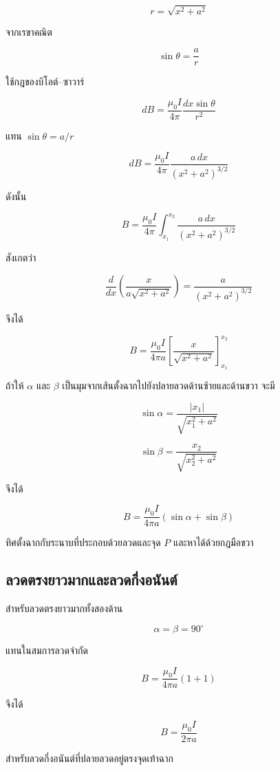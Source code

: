 \[
r=\sqrt{x^2+a^2}
\]

จากเรขาคณิต

\[
\sin\theta=\frac{a}{r}
\]

ใช้กฎของบิโอต์--ซาวาร์

\[
dB
=
\frac{\mu_0 I}{4\pi}
\frac{dx\sin\theta}{r^2}
\]

แทน $\sin\theta=a/r$

\[
dB
=
\frac{\mu_0 I}{4\pi}
\frac{a\,dx}{(x^2+a^2)^{3/2}}
\]

ดังนั้น

\[
B
=
\frac{\mu_0 I}{4\pi}
\int_{x_1}^{x_2}
\frac{a\,dx}{(x^2+a^2)^{3/2}}
\]

สังเกตว่า

\[
\frac{d}{dx}
\left(
\frac{x}{a\sqrt{x^2+a^2}}
\right)
=
\frac{a}{(x^2+a^2)^{3/2}}
\]

จึงได้

\[
B
=
\frac{\mu_0 I}{4\pi a}
\left[
\frac{x}{\sqrt{x^2+a^2}}
\right]_{x_1}^{x_2}
\]

ถ้าให้ $\alpha$ และ $\beta$ เป็นมุมจากเส้นตั้งฉากไปยังปลายลวดด้านซ้ายและด้านขวา จะมี

\[
\sin\alpha
=
\frac{|x_1|}{\sqrt{x_1^2+a^2}}
\]

\[
\sin\beta
=
\frac{x_2}{\sqrt{x_2^2+a^2}}
\]

จึงได้

\begin{tcolorbox}[title={สนามจากลวดตรงยาวจำกัด}]
\[
\boxed{
B
=
\frac{\mu_0 I}{4\pi a}
(\sin\alpha+\sin\beta)}
\]
\end{tcolorbox}

ทิศตั้งฉากกับระนาบที่ประกอบด้วยลวดและจุด $P$ และหาได้ด้วยกฎมือขวา

\subsection{ลวดตรงยาวมากและลวดกึ่งอนันต์}

สำหรับลวดตรงยาวมากทั้งสองด้าน

\[
\alpha=\beta=90^\circ
\]

แทนในสมการลวดจำกัด

\[
B
=
\frac{\mu_0 I}{4\pi a}
(1+1)
\]

จึงได้

\begin{tcolorbox}[title={สนามจากลวดตรงยาวมาก}]
\[
\boxed{B=\frac{\mu_0 I}{2\pi a}}
\]
\end{tcolorbox}

สำหรับลวดกึ่งอนันต์ที่ปลายลวดอยู่ตรงจุดเท้าฉาก

